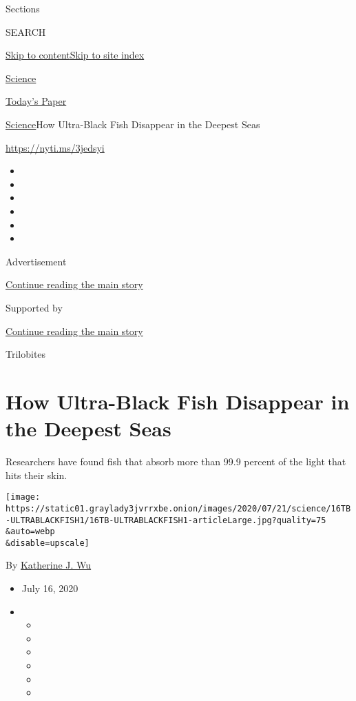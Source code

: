 Sections

SEARCH

\protect\hyperlink{site-content}{Skip to
content}\protect\hyperlink{site-index}{Skip to site index}

\href{https://www.nytimes3xbfgragh.onion/section/science}{Science}

\href{https://myaccount.nytimes3xbfgragh.onion/auth/login?response_type=cookie\&client_id=vi}{}

\href{https://www.nytimes3xbfgragh.onion/section/todayspaper}{Today's
Paper}

\href{/section/science}{Science}\textbar{}How Ultra-Black Fish Disappear
in the Deepest Seas

\url{https://nyti.ms/3jedsyi}

\begin{itemize}
\item
\item
\item
\item
\item
\item
\end{itemize}

Advertisement

\protect\hyperlink{after-top}{Continue reading the main story}

Supported by

\protect\hyperlink{after-sponsor}{Continue reading the main story}

Trilobites

\hypertarget{how-ultra-black-fish-disappear-in-the-deepest-seas}{%
\section{How Ultra-Black Fish Disappear in the Deepest
Seas}\label{how-ultra-black-fish-disappear-in-the-deepest-seas}}

Researchers have found fish that absorb more than 99.9 percent of the
light that hits their skin.

\texttt{[image: https://static01.graylady3jvrrxbe.onion/images/2020/07/21/science/16TB-ULTRABLACKFISH1/16TB-ULTRABLACKFISH1-articleLarge.jpg?quality=75\\\&auto=webp\\\&disable=upscale]}

By
\href{https://www.nytimes3xbfgragh.onion/by/katherine-j--wu}{Katherine
J. Wu}

\begin{itemize}
\item
  July 16, 2020
\item
  \begin{itemize}
  \item
  \item
  \item
  \item
  \item
  \item
  \end{itemize}
\end{itemize}

